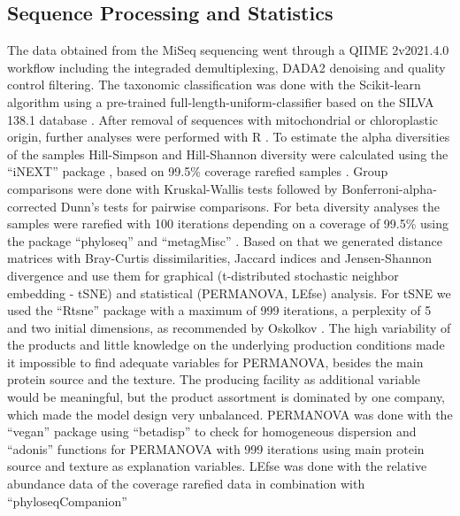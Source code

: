 \documentclass[preprint, 3p,
authoryear]{elsarticle} %
\begin{document}
\hypertarget{sequence-processing-and-statistics}{%
\subsection{Sequence Processing and
Statistics}\label{sequence-processing-and-statistics}}

The data obtained from the MiSeq sequencing went through a QIIME
2\texttrademark v2021.4.0 \citep{Bolyen.2019} workflow including the
integraded demultiplexing, DADA2 denoising and quality control
filtering. The taxonomic classification was done with the Scikit-learn
algorithm using a pre-trained full-length-uniform-classifier based on
the SILVA 138.1 database
\citep{Quast.2013, Bokulich.2018, Kaehler.2019, Robeson.2021, Kaehler.2022}.
After removal of sequences with mitochondrial or chloroplastic origin,
further analyses were performed with R \citep{RCoreTeam.2021}. To
estimate the alpha diversities of the samples Hill-Simpson and
Hill-Shannon diversity were calculated using the ``iNEXT'' package
\citep{Hsieh.2022}, based on 99.5\% coverage rarefied samples
\citep{Chao.2012, Roswell.2021}. Group comparisons were done with
Kruskal-Wallis tests followed by Bonferroni-alpha-corrected Dunn's tests
for pairwise comparisons. For beta diversity analyses the samples were
rarefied with 100 iterations depending on a coverage of 99.5\% using the
package ``phyloseq'' \citep{McMurdie.2021} and ``metagMisc''
\citep{Mikryukov.2022}. Based on that we generated distance matrices
with Bray-Curtis dissimilarities, Jaccard indices and Jensen-Shannon
divergence and use them for graphical (t-distributed stochastic neighbor
embedding - tSNE) and statistical (PERMANOVA, LEfse) analysis. For tSNE
we used the ``Rtsne'' package \citep{Krijthe.2022} with a maximum of 999
iterations, a perplexity of 5 and two initial dimensions, as recommended
by Oskolkov \citep{Oskolkov.2019}. The high variability of the products
and little knowledge on the underlying production conditions made it
impossible to find adequate variables for PERMANOVA, besides the main
protein source and the texture. The producing facility as additional
variable would be meaningful, but the product assortment is dominated by
one company, which made the model design very unbalanced. PERMANOVA was
done with the ``vegan'' package \citep{Oksanen.2022} using ``betadisp''
to check for homogeneous dispersion and ``adonis'' functions for
PERMANOVA with 999 iterations using main protein source and texture as
explanation variables. LEfse was done with the relative abundance data
of the coverage rarefied data in combination with ``phyloseqCompanion''
\end{document}
